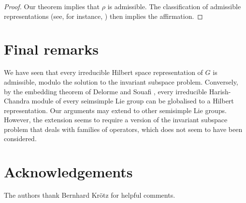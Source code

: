 \documentclass[12pt,a4paper]{amsart}
\theoremstyle{definition}
\theoremstyle{remark}
\numberwithin{equation}{section}
\begin{document}
\begin{proof}
Our theorem implies that $\rho$ is admissible.
The classification of admissible representations (see, for instance, \cite[Chapter 2]{HT})  then implies the affirmation.
\end{proof}


\section{Final remarks}
We have seen that every irreducible Hilbert space representation of $G$ is admissible, modulo the solution to the invariant subspace problem.
Conversely, by the embedding theorem of Delorme and Souafi  \cite{DS}, every irreducible Harish-Chandra module of every seimsimple Lie group can be globalised to a  Hilbert representation.
Our arguments may extend to other semisimple Lie groups. 
However, the extension seems to require a version of the invariant subspace problem that deals with families of operators, which does not seem to have been considered.

\section{Acknowledgements}
The authors thank Bernhard Kr\"otz for helpful comments.
\end{document}
